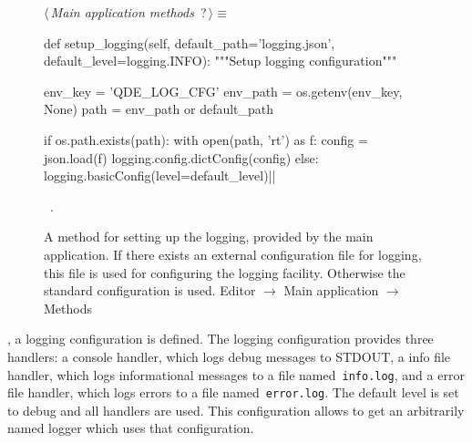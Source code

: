 \documentclass[%
    a4paper,    %
    justified,  %
    nobib,      %
    openany     %
]{tufte-book}
\begin{document}
\begin{figure}
\begin{flushleft} \small
\begin{minipage}{\linewidth}\label{scrap55}\raggedright\small
{} $\langle\,${\itshape Main application methods}\nobreak\ {\footnotesize {?}}$\,\rangle\equiv$
\vspace{-1ex}
\begin{pythoncode}
def setup_logging(self,
                  default_path='logging.json',
                  default_level=logging.INFO):
    """Setup logging configuration"""

    env_key  = 'QDE_LOG_CFG'
    env_path = os.getenv(env_key, None)
    path     = env_path or default_path

    if os.path.exists(path):
        with open(path, 'rt') as f:
            config = json.load(f)
            logging.config.dictConfig(config)
    else:
        logging.basicConfig(level=default_level)|\NWsep|
\end{pythoncode}
\vspace{1.5ex}
\footnotesize
\begin{list}{}{\setlength{\itemsep}{-\parsep}\setlength{\itemindent}{-\leftmargin}}
\item \NWtxtMacroRefIn\ .

\item{}
\end{list}
\end{minipage}\vspace{4ex}
\end{flushleft}
\caption{A method for setting up the logging, provided by the main application.
  If there exists an external configuration file for logging, this file is used
  for configuring the logging facility. Otherwise the standard configuration is
  used.
  \newline{}\newline{}Editor $\rightarrow$ Main application
  $\rightarrow$ Methods}
\label{logging:lst:main-application:methods:setup-logging}
\end{figure}

, a logging
configuration is defined. The logging configuration provides three handlers: a
console handler, which logs debug messages to STDOUT, a info file handler, which
logs informational messages to a file named~\verb=info.log=, and a error file
handler, which logs errors to a file named~\verb=error.log=. The default level
is set to debug and all handlers are used. This configuration allows to get an
arbitrarily named logger which uses that configuration.
\end{document}
